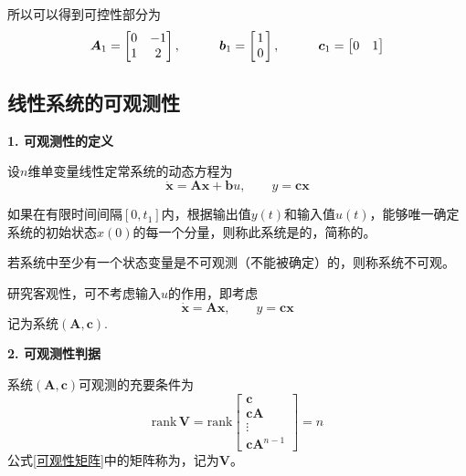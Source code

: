 所以可以得到可控性部分为
\begin{equation*}
	\bm{A}_1 = 
	\begin{bmatrix}
		0 & -1 \\
		1 & 2
	\end{bmatrix}
	, \qquad \quad 
	\bm{b}_1 =
	\begin{bmatrix}
		\hspace*{0.5mm} 1 \hspace*{0.5mm}\\
		0 
	\end{bmatrix}
	, \qquad \quad 
	\bm{c}_1 = 
	\begin{bmatrix}
		0 & 1
	\end{bmatrix}
\end{equation*}
\vspace*{1em}

\subsection{线性系统的可观测性}
\noindent \textbf{1. 可观测性的定义}

设$n$维单变量线性定常系统的动态方程为
\begin{equation}
	\dot{\bm{x}} = \bm{Ax} + \bm{b}u, \qquad y =\bm{cx}
\end{equation}

如果在有限时间间隔$[0,t_1]$内，根据输出值$y(t)$和输入值$u(t)$，能够唯一确定系统的初始状态$x(0)$的每一个分量，则称此系统是的，简称的。

若系统中至少有一个状态变量是不可观测（不能被确定）的，则称系统不可观。

研究客观性，可不考虑输入$u$的作用，即考虑
\begin{equation}
	\dot{\bm{x}} = \bm{Ax},\qquad y = \bm{cx}
\end{equation}
记为系统$(\bm{A,c})$.
\vspace*{0.5em}

\noindent \textbf{2. 可观测性判据}

系统$(\bm{A,c})$可观测的充要条件为
\begin{equation}
	\text{rank} \, \bm{V} = \text{rank}
	\begin{bmatrix}
		\bm{c}\\
		\bm{cA}\\
		\vdots\\
		\bm{cA}^{n-1}
	\end{bmatrix}
	= n
	\label{可观性矩阵}
\end{equation}
公式\eqref{可观性矩阵}中的矩阵称为，记为$\bm{V}$。

